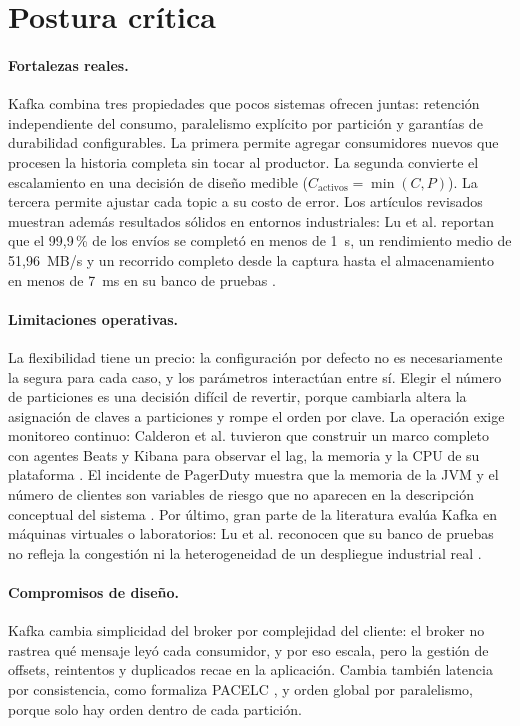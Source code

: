 \documentclass[11pt,a4paper]{article}
\begin{document}
\section{Postura crítica}

\paragraph{Fortalezas reales.}
Kafka combina tres propiedades que pocos sistemas ofrecen juntas: retención independiente del consumo, paralelismo explícito por partición y garantías de durabilidad configurables. La primera permite agregar consumidores nuevos que procesen la historia completa sin tocar al productor. La segunda convierte el escalamiento en una decisión de diseño medible ($C_{\text{activos}} = \min(C,P)$). La tercera permite ajustar cada topic a su costo de error. Los artículos revisados muestran además resultados sólidos en entornos industriales: Lu et al. reportan que el 99,9\,\% de los envíos se completó en menos de 1~s, un rendimiento medio de 51,96~MB/s y un recorrido completo desde la captura hasta el almacenamiento en menos de 7~ms en su banco de pruebas \cite{lu2025proposal}.

\paragraph{Limitaciones operativas.}
La flexibilidad tiene un precio: la configuración por defecto no es necesariamente la segura para cada caso, y los parámetros interactúan entre sí. Elegir el número de particiones es una decisión difícil de revertir, porque cambiarla altera la asignación de claves a particiones y rompe el orden por clave. La operación exige monitoreo continuo: Calderon et al. tuvieron que construir un marco completo con agentes Beats y Kibana para observar el lag, la memoria y la CPU de su plataforma \cite{calderon2024monitoring}. El incidente de PagerDuty muestra que la memoria de la JVM y el número de clientes son variables de riesgo que no aparecen en la descripción conceptual del sistema \cite{pagerduty2025}. Por último, gran parte de la literatura evalúa Kafka en máquinas virtuales o laboratorios: Lu et al. reconocen que su banco de pruebas no refleja la congestión ni la heterogeneidad de un despliegue industrial real \cite{lu2025proposal}.

\paragraph{Compromisos de diseño.}
Kafka cambia simplicidad del broker por complejidad del cliente: el broker no rastrea qué mensaje leyó cada consumidor, y por eso escala, pero la gestión de offsets, reintentos y duplicados recae en la aplicación. Cambia también latencia por consistencia, como formaliza PACELC \cite{abadi2012consistency}, y orden global por paralelismo, porque solo hay orden dentro de cada partición.
\end{document}
